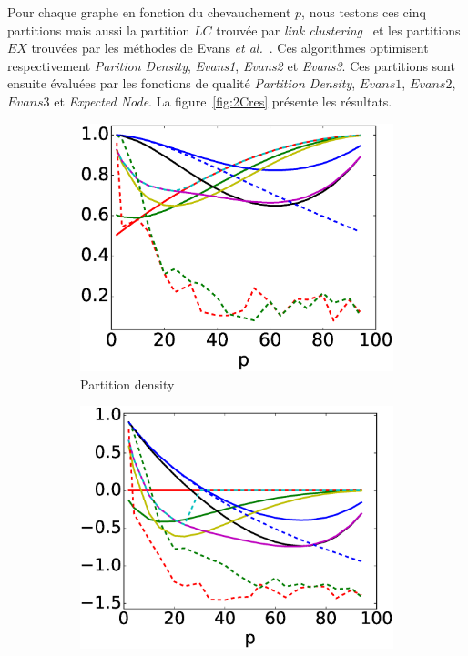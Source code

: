 Pour chaque graphe en fonction du chevauchement $p$, nous testons ces cinq partitions mais aussi la partition $LC$ trouvée par \textit{link clustering}~\cite{Ahn2010a} et les partitions $EX$ trouvées par les méthodes de Evans \textit{et al.}~\cite{Evans2009}.
Ces algorithmes optimisent respectivement \emph{Parition Density}, \emph{Evans1}, \emph{Evans2} et \emph{Evans3}.
Ces partitions sont ensuite évaluées par les fonctions de qualité \emph{Partition Density}, $Evans1$, $Evans2$, $Evans3$ et \emph{Expected Node}.
La figure~\ref{fig:2Cres} présente les résultats.


\begin{figure}[h]
\centering
	\begin{subfigure}{0.31\textwidth}
		\includegraphics[width=\linewidth]{img/ExpectedNodes/2Cliques/2Clique_Partition_density.eps}
		\caption{\label{fig:2CAhn}Partition density}		
	\end{subfigure}
	\begin{subfigure}{0.31\textwidth}
		\includegraphics[width=\linewidth]{img/ExpectedNodes/2Cliques/2Clique_Expected_Nodes.eps}

\end{subfigure}
\end{figure}
